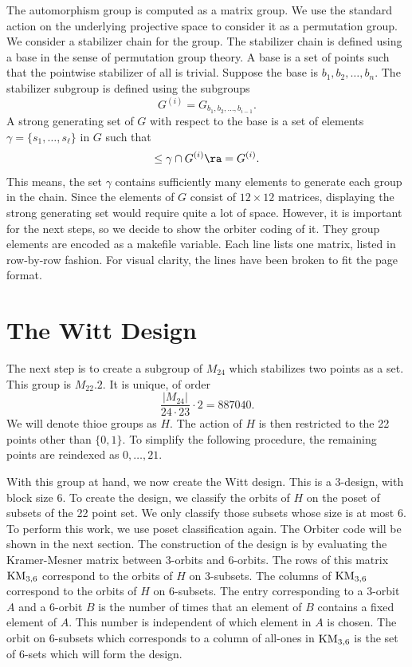 \documentclass[10pt]{article}
\begin{document}

\bigskip

The automorphism group is computed as a matrix group. We use the standard action on the underlying projective space to consider it as a permutation group. 
We consider a stabilizer chain for the group. The stabilizer chain is defined using a base 
in the sense of permutation group theory. A base is a set of points such that the pointwise stabilizer of all is trivial. 
Suppose the base is $b_1,b_2,\ldots, b_n.$ The stabilizer subgroup is defined 
using the subgroups 
$$
G^{(i)} = G_{b_1,b_2,\ldots, b_{i-1}}.
$$
A strong generating set of $G$ with respect to the base is a set of elements $\gamma = \{s_1,\ldots,s_\ell\}$ in $G$ 
such that 
$$
\le \gamma \cap G^{(i)} \ra = G^{(i)}.
$$
This means, the set $\gamma$ contains sufficiently many elements to generate each group in the chain. 
Since the elements of $G$ consist of $12 \times 12$ matrices, 
displaying the strong generating set would require quite a lot of space. 
However, it is important for the next steps, so we decide to show the orbiter coding of 
it.
They group elements 
are encoded as a makefile variable. Each line lists one matrix, listed in row-by-row fashion. 
For visual clarity, the lines have been broken to fit the page format. 






\bigskip



\section{The Witt Design}

The next step is to create a subgroup of $M_{24}$ which stabilizes two points as a set. 
This group is $M_{22}.2$. It is unique, of order 
$$
\frac{|M_{24}|}{24 \cdot 23} \cdot 2 = 887040. 
$$
We will denote thioe groups as $H$. 
The action of $H$ is then restricted to the 22 points other than $\{0,1\}.$ To simplify the following procedure, the remaining points are reindexed as $0,\ldots,21.$ 

\bigskip

With this group at hand, we now create the Witt design. 
This is a $3$-design, with block size 6. 
To create the design, we classify the orbits of $H$ 
on the poset of subsets of the 22 point set. 
We only classify those subsets whose size is at most 6. 
To perform this work, we use poset classification again. 
The Orbiter code will be shown in the next section. 
The construction of the design is by evaluating the Kramer-Mesner matrix between $3$-orbits and $6$-orbits. 
The rows of this matrix ${\rm KM}_{3,6}$ correspond to the orbits of $H$ on 3-subsets. 
The columns of ${\rm KM}_{3,6}$ correspond to the orbits of $H$ on $6$-subsets. 
The entry corresponding to a $3$-orbit $A$ and a $6$-orbit $B$ is the number of times that an element of $B$ contains a fixed element of $A$. This number is independent of which element in $A$ is chosen. 
The orbit on $6$-subsets which corresponds to a column of all-ones in ${\rm KM}_{3,6}$ is the set of $6$-sets which will form the design. 
\end{document}
